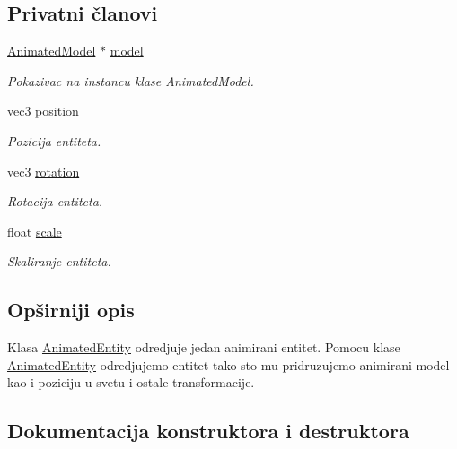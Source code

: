 \subsection*{Privatni članovi}
\begin{DoxyCompactItemize}
\item 
\hyperlink{classmodel_1_1AnimatedModel}{Animated\+Model} $\ast$ \hyperlink{classentity_1_1AnimatedEntity_a1f9e73e14bf1588ed9e7c9e7f7d4aab3}{model}
\begin{DoxyCompactList}\small\item\em Pokazivac na instancu klase Animated\+Model. \end{DoxyCompactList}\item 
vec3 \hyperlink{classentity_1_1AnimatedEntity_ab02891959f4c1191807e267c48466230}{position}
\begin{DoxyCompactList}\small\item\em Pozicija entiteta. \end{DoxyCompactList}\item 
vec3 \hyperlink{classentity_1_1AnimatedEntity_a32f7718856950b74d40f4a96c1aa6f3d}{rotation}
\begin{DoxyCompactList}\small\item\em Rotacija entiteta. \end{DoxyCompactList}\item 
float \hyperlink{classentity_1_1AnimatedEntity_a137e8fe0398142e9dedebb3eb1fe4f2f}{scale}
\begin{DoxyCompactList}\small\item\em Skaliranje entiteta. \end{DoxyCompactList}\end{DoxyCompactItemize}


\subsection{Opširniji opis}
Klasa \hyperlink{classentity_1_1AnimatedEntity}{Animated\+Entity} odredjuje jedan animirani entitet. Pomocu klase \hyperlink{classentity_1_1AnimatedEntity}{Animated\+Entity} odredjujemo entitet tako sto mu pridruzujemo animirani model kao i poziciju u svetu i ostale transformacije. 

\subsection{Dokumentacija konstruktora i destruktora}
\mbox{\label{classentity_1_1AnimatedEntity_a5b237ce1eaf0be4ea8d769ee94ea65b2}} 
